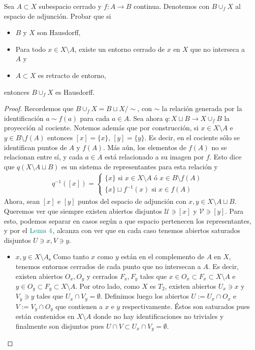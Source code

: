 \documentclass[11pt]{article}
\newcommand{\paint}[2]{\color{#1}{#2}}
\newenvironment{exercise}[2][Ejercicio]{\begin{trivlist}
\item[\hskip \labelsep \paint{grey-light-blue}{{\bfseries #1}}\hskip \labelsep {\bfseries #2.}]}{\end{trivlist}}
\begin{document}
\begin{exercise}{5} Sea $A \subset X$ subespacio cerrado y $f : A \to B$ continua. Denotemos con $B \cup_f X$ al espacio de
adjunci\'on. Probar que si
\begin{itemize}
\item $B$ y $X$ son Hausdorff,
\item Para todo $x \in X \setminus A$, existe un entorno cerrado de $x$ en $X$ que no interseca a $A$ y
\item $A \subset X$ es retracto de entorno,
\end{itemize}
entonces $B \cup_f X$ es Hausdorff.
\end{exercise}
\begin{proof} Recordemos que $B \cup_f X = B \sqcup X / \sim$, con $\sim$ la relaci\'on generada por la identificaci\'on $a \sim f(a)$ para cada $a \in A$. Sea ahora $q : X \sqcup B \to X \cup_f B$ la proyecci\'on al cociente. Notemos adem\'as que por construcci\'on, si $x \in X \setminus A$ e $y \in B \setminus f(A)$ entonces $[x] = \{x\}$, $[y] = \{y\}$. Es decir, en el cociente s\'olo se identifican puntos de $A$ y $f(A)$. M\'as a\'un, los elementos de $f(A)$ no se relacionan entre s\'i, y cada $a \in A$ est\'a relacionado a su imagen por $f$. Esto dice que $q(X \setminus A \sqcup B)$ es un sistema de representantes para esta relaci\'on y
\begin{align*}
q^{-1}([x]) = \begin{cases}
\{x\} \text{ si $x \in X \setminus A$ \'o $x \in B \setminus f(A)$} \\
\{x\} \sqcup f^{-1}(x) \text{ si $x \in f(A)$}
\end{cases}
\end{align*}
Ahora, sean $[x]$ e $[y]$ puntos del espacio de adjunci\'on con $x,y \in X \setminus A \sqcup B$. Queremos ver que siempre existen abiertos disjuntos $\mathcal{U} \ni [x]$ y $\mathcal{V} \ni [y]$. Para esto, podemos separar en casos seg\'un a que espacio pertenecen los representantes, y por el $\paint{grey-light-blue}{\text{Lema }4}$, alcanza con ver que en cada caso tenemos abiertos saturados disjuntos $U \ni x, V\ni y$.
\begin{itemize}
\item \underline{\textbf{\paint{grey-light-blue}{\text{Caso $1$:}}} $x,y \in X \setminus A$.} Como tanto $x$ como $y$ est\'an en el complemento de $A$ en $X$, tenemos entornos cerrados de cada punto que no intersecan a $A$. Es decir, existen abiertos $O_x,O_y$ y cerrados $F_x,F_y$ tales que $x \in O_x \subset F_x \subset X \setminus A$ e $y \in O_y \subset F_y \subset X \setminus A$. Por otro lado, como $X$ es $T_2$, existen abiertos $U_x \ni x$ y $V_y \ni y$ tales que $U_x \cap V_y = \emptyset$. Definimos luego los abiertos $U := U_x \cap O_x$ e $V := V_y \cap O_y$ que contienen a $x$ e $y$ respectivamente. \'Estos son saturados pues est\'an contenidos en $X \setminus A$ donde no hay identificaciones no triviales y finalmente son disjuntos pues $U \cap V \subset U_x \cap V_y = \emptyset$.

\end{itemize}
\end{proof}
\end{document}
